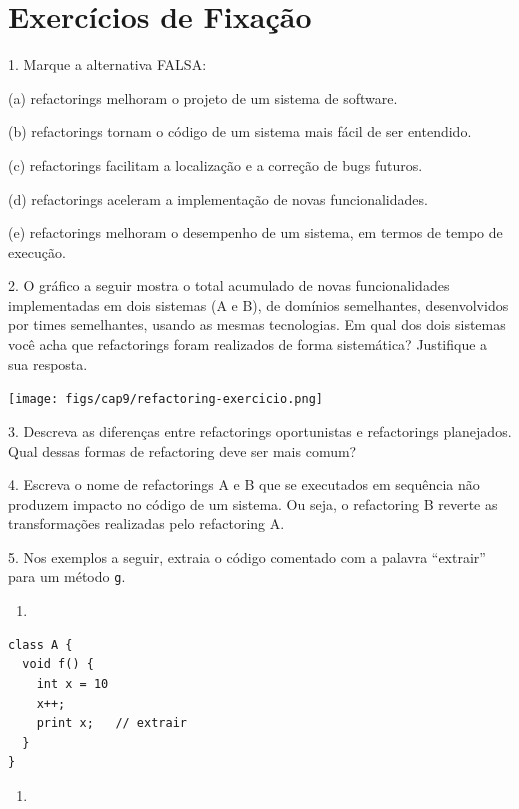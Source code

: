 \documentclass[
  11pt,
  twoside]{book}
\newcommand{\passthrough}[1]{#1}
\providecommand{\tightlist}{%
  \setlength{\itemsep}{0pt}\setlength{\parskip}{0pt}}
\begin{document}
\hypertarget{exercuxedcios-de-fixauxe7uxe3o-8}{%
\section*{Exercícios de
Fixação}\label{exercuxedcios-de-fixauxe7uxe3o-8}}

1. Marque a alternativa FALSA:

(a) refactorings melhoram o projeto de um sistema de software.

(b) refactorings tornam o código de um sistema mais fácil de ser
entendido.

(c) refactorings facilitam a localização e a correção de bugs futuros.

(d) refactorings aceleram a implementação de novas funcionalidades.

(e) refactorings melhoram o desempenho de um sistema, em termos de tempo
de execução.

2. O gráfico a seguir mostra o total acumulado de novas funcionalidades
implementadas em dois sistemas (A e B), de domínios semelhantes,
desenvolvidos por times semelhantes, usando as mesmas tecnologias. Em
qual dos dois sistemas você acha que refactorings foram realizados de
forma sistemática? Justifique a sua resposta.

\texttt{[image: figs/cap9/refactoring-exercicio.png]}

3. Descreva as diferenças entre refactorings oportunistas e refactorings
planejados. Qual dessas formas de refactoring deve ser mais comum?

4. Escreva o nome de refactorings A e B que se executados em sequência
não produzem impacto no código de um sistema. Ou seja, o refactoring B
reverte as transformações realizadas pelo refactoring A.

5. Nos exemplos a seguir, extraia o código comentado com a palavra
``extrair'' para um método \passthrough{\lstinline!g!}.

\newpage

\begin{enumerate}
\def\labelenumi{(\alph{enumi})}
\tightlist
\item
\end{enumerate}

\begin{lstlisting}
class A {
  void f() {
    int x = 10
    x++;      
    print x;   // extrair
  }
}
\end{lstlisting}

\begin{enumerate}
\def\labelenumi{(\alph{enumi})}
\setcounter{enumi}{1}
\tightlist
\item
\end{enumerate}
\end{document}
